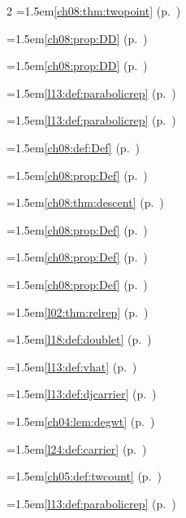 \begin{multicols}{2}
\hangindent=1.5em\quad \ref{ch08:thm:twopoint} (p.~\pageref{ch08:thm:twopoint})\par
\hangindent=1.5em\quad \ref{ch08:prop:DD} (p.~\pageref{ch08:prop:DD})\par
\hangindent=1.5em\quad \ref{ch08:prop:DD} (p.~\pageref{ch08:prop:DD})\par
\hangindent=1.5em\quad \ref{l13:def:parabolicrep} (p.~\pageref{l13:def:parabolicrep})\par
\hangindent=1.5em\quad \ref{l13:def:parabolicrep} (p.~\pageref{l13:def:parabolicrep})\par
\hangindent=1.5em\quad \ref{ch08:def:Def} (p.~\pageref{ch08:def:Def})\par
\hangindent=1.5em\quad \ref{ch08:prop:Def} (p.~\pageref{ch08:prop:Def})\par
\hangindent=1.5em\quad \ref{ch08:thm:descent} (p.~\pageref{ch08:thm:descent})\par
\hangindent=1.5em\quad \ref{ch08:prop:Def} (p.~\pageref{ch08:prop:Def})\par
\hangindent=1.5em\quad \ref{ch08:prop:Def} (p.~\pageref{ch08:prop:Def})\par
\hangindent=1.5em\quad \ref{ch08:prop:Def} (p.~\pageref{ch08:prop:Def})\par
\hangindent=1.5em\quad \ref{l02:thm:relrep} (p.~\pageref{l02:thm:relrep})\par
\hangindent=1.5em\quad \ref{l18:def:doublet} (p.~\pageref{l18:def:doublet})\par
\hangindent=1.5em\quad \ref{l13:def:vhat} (p.~\pageref{l13:def:vhat})\par
\hangindent=1.5em\quad \ref{l13:def:djcarrier} (p.~\pageref{l13:def:djcarrier})\par
\hangindent=1.5em\quad \ref{ch04:lem:degwt} (p.~\pageref{ch04:lem:degwt})\par
\hangindent=1.5em\quad \ref{l24:def:carrier} (p.~\pageref{l24:def:carrier})\par
\hangindent=1.5em\quad \ref{ch05:def:twcount} (p.~\pageref{ch05:def:twcount})\par
\hangindent=1.5em\quad \ref{l13:def:parabolicrep} (p.~\pageref{l13:def:parabolicrep})\par

\end{multicols}
